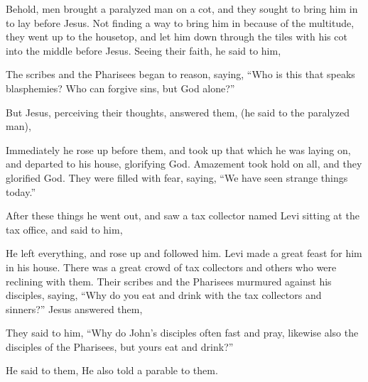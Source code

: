 {Behold, men brought a paralyzed man on a cot, and they sought to bring him in to lay before Jesus.
Not finding a way to bring him in because of the multitude, they went up to the housetop, and let him down through the tiles with his cot into the middle before Jesus.
Seeing their faith, he said to him,
{}
\par }{\PP {}The scribes and the Pharisees began to reason, saying, “Who is this that speaks blasphemies? Who can forgive sins, but God alone?”
\par }{\PP {}But Jesus, perceiving their thoughts, answered them,
{}
 (he said to the paralyzed man),
{}
\par }{\PP {}Immediately he rose up before them, and took up that which he was laying on, and departed to his house, glorifying God.
Amazement took hold on all, and they glorified God. They were filled with fear, saying, “We have seen strange things today.”
\par }{\PP {}After these things he went out, and saw a tax collector named Levi sitting at the tax office, and said to him,
{}
\par }{\PP {}He left everything, and rose up and followed him.
Levi made a great feast for him in his house. There was a great crowd of tax collectors and others who were reclining with them.
Their scribes and the Pharisees murmured against his disciples, saying, “Why do you eat and drink with the tax collectors and sinners?”
Jesus answered them,
{}
\par }{\PP {}They said to him, “Why do John’s disciples often fast and pray, likewise also the disciples of the Pharisees, but yours eat and drink?”
\par }{\PP {}He said to them,
{}
He also told a parable to them.
{}

}
